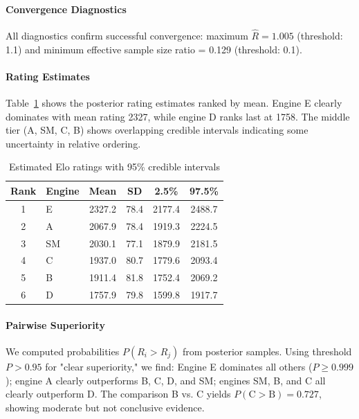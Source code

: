  \paragraph{Convergence Diagnostics}
  All diagnostics confirm successful convergence: maximum $\hat{R} = 1.005$ (threshold: 1.1) and minimum effective sample size ratio = 0.129 (threshold: 0.1).

  \paragraph{Rating Estimates}
  Table~\ref{tab:ratings} shows the posterior rating estimates ranked by mean. Engine E clearly dominates with mean rating 2327, while engine D ranks last at 1758. The middle
  tier (A, SM, C, B) shows overlapping credible intervals indicating some uncertainty in relative ordering.

  \begin{table}[h]
  \centering
  \caption{Estimated Elo ratings with 95\% credible intervals}
  \label{tab:ratings}
  \begin{tabular}{clcccc}
  \hline
  \textbf{Rank} & \textbf{Engine} & \textbf{Mean} & \textbf{SD} & \textbf{2.5\%} & \textbf{97.5\%} \\
  \hline
  1 & E  & 2327.2 & 78.4 & 2177.4 & 2488.7 \\
  2 & A  & 2067.9 & 78.4 & 1919.3 & 2224.5 \\
  3 & SM & 2030.1 & 77.1 & 1879.9 & 2181.5 \\
  4 & C  & 1937.0 & 80.7 & 1779.6 & 2093.4 \\
  5 & B  & 1911.4 & 81.8 & 1752.4 & 2069.2 \\
  6 & D  & 1757.9 & 79.8 & 1599.8 & 1917.7 \\
  \hline
  \end{tabular}
  \end{table}

  \paragraph{Pairwise Superiority}
  We computed probabilities $P(R_i > R_j)$ from posterior samples. Using threshold $P > 0.95$ for "clear superiority," we find: Engine E dominates all others ($P \geq 0.999$);
   engine A clearly outperforms B, C, D, and SM; engines SM, B, and C all clearly outperform D. The comparison B vs. C yields $P(\text{C} > \text{B}) = 0.727$, showing
  moderate but not conclusive evidence.
